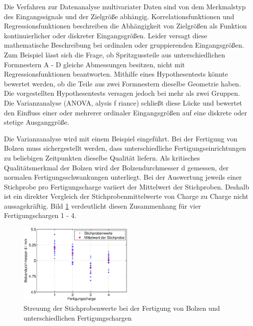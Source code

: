 \noindent Die Verfahren zur Datenanalyse multivariater Daten sind von dem Merkmalstyp des Eingangssignals und der Zielgr\"{o}{\ss}e abh\"{a}ngig. Korrelationsfunktionen und Regressionsfunktionen beschreiben die Abh\"{a}ngigkeit von Zielgr\"{o}{\ss}en als Funktion kontinuierlicher oder diskreter Eingangsgr\"{o}{\ss}en. Leider versagt diese mathematische Beschreibung bei ordinalen oder gruppierenden Eingangsgr\"{o}{\ss}en. Zum Beispiel l\"{a}sst sich die Frage, ob Spritzgussteile aus unterschiedlichen Formnestern A - D gleiche Abmessungen besitzen, nicht mit Regressionsfunktionen beantworten. Mithilfe eines Hypothesentests k\"{o}nnte bewertet werden, ob die Teile aus zwei Formnestern dieselbe Geometrie haben. Die vorgestellten Hypothesentests versagen jedoch bei mehr als zwei Gruppen. Die Varianzanalyse (ANOVA, alysis f riance) schlie{\ss}t diese L\"{u}cke und bewertet den Einfluss einer oder mehrerer ordinaler Eingangsgr\"{o}{\ss}en auf eine diskrete oder stetige Ausganggr\"{o}{\ss}e. \newline

\noindent Die Varianzanalyse wird mit einem Beispiel eingef\"{u}hrt. Bei der Fertigung von Bolzen muss sichergestellt werden, dass unterschiedliche Fertigungseinrichtungen zu beliebigen Zeitpunkten dieselbe Qualit\"{a}t liefern. Als kritisches Qualit\"{a}tsmerkmal der Bolzen wird der Bolzendurchmesser d gemessen, der normalen Fertigungsschwankungen unterliegt. Bei der Auswertung jeweils einer Stichprobe pro Fertigungscharge variiert der Mittelwert der Stichproben. Deshalb ist ein direkter Vergleich der Stichprobenmittelwerte von Charge zu Charge nicht aussagekr\"{a}ftig. Bild \ref{fig:EinfuehrungBolzendurchmesser1} verdeutlicht diesen Zusammenhang f\"{u}r vier Fertigungschargen 1 - 4.

\noindent 
\begin{figure}[H]
  \centerline{\includegraphics[width=0.5\textwidth]{Kapitel9/Bilder/image1}}
  \caption{Streuung der Stichprobenwerte bei der Fertigung von Bolzen und unterschiedlichen Fertigungschargen}
  \label{fig:EinfuehrungBolzendurchmesser1}
\end{figure}


